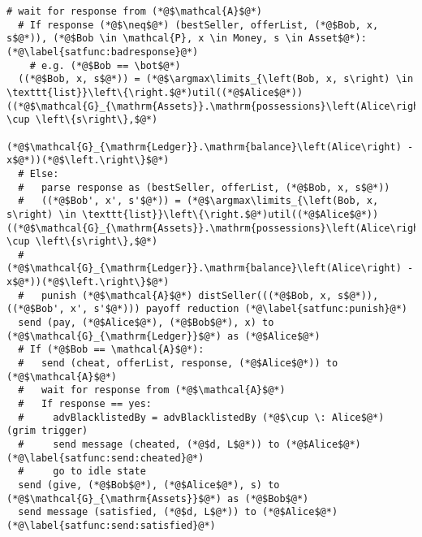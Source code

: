 \begin{lstlisting}[label=satfunc, style=numbers]
  # wait for response from (*@$\mathcal{A}$@*)
  # If response (*@$\neq$@*) (bestSeller, offerList, (*@$Bob, x, s$@*)), (*@$Bob \in \mathcal{P}, x \in Money, s \in Asset$@*): (*@\label{satfunc:badresponse}@*)
    # e.g. (*@$Bob == \bot$@*)
  ((*@$Bob, x, s$@*)) = (*@$\argmax\limits_{\left(Bob, x, s\right) \in \texttt{list}}\left\{\right.$@*)util((*@$Alice$@*))((*@$\mathcal{G}_{\mathrm{Assets}}.\mathrm{possessions}\left(Alice\right) \cup \left\{s\right\},$@*)
        (*@$\mathcal{G}_{\mathrm{Ledger}}.\mathrm{balance}\left(Alice\right) - x$@*))(*@$\left.\right\}$@*)
  # Else:
  #   parse response as (bestSeller, offerList, (*@$Bob, x, s$@*))
  #   ((*@$Bob', x', s'$@*)) = (*@$\argmax\limits_{\left(Bob, x, s\right) \in \texttt{list}}\left\{\right.$@*)util((*@$Alice$@*))((*@$\mathcal{G}_{\mathrm{Assets}}.\mathrm{possessions}\left(Alice\right) \cup \left\{s\right\},$@*)
  #      (*@$\mathcal{G}_{\mathrm{Ledger}}.\mathrm{balance}\left(Alice\right) - x$@*))(*@$\left.\right\}$@*)
  #   punish (*@$\mathcal{A}$@*) distSeller(((*@$Bob, x, s$@*)), ((*@$Bob', x', s'$@*))) payoff reduction (*@\label{satfunc:punish}@*)
  send (pay, (*@$Alice$@*), (*@$Bob$@*), x) to (*@$\mathcal{G}_{\mathrm{Ledger}}$@*) as (*@$Alice$@*)
  # If (*@$Bob == \mathcal{A}$@*):
  #   send (cheat, offerList, response, (*@$Alice$@*)) to (*@$\mathcal{A}$@*)
  #   wait for response from (*@$\mathcal{A}$@*)
  #   If response == yes:
  #     advBlacklistedBy = advBlacklistedBy (*@$\cup \: Alice$@*) (grim trigger)
  #     send message (cheated, (*@$d, L$@*)) to (*@$Alice$@*) (*@\label{satfunc:send:cheated}@*)
  #     go to idle state
  send (give, (*@$Bob$@*), (*@$Alice$@*), s) to (*@$\mathcal{G}_{\mathrm{Assets}}$@*) as (*@$Bob$@*)
  send message (satisfied, (*@$d, L$@*)) to (*@$Alice$@*) (*@\label{satfunc:send:satisfied}@*)
\end{lstlisting}
